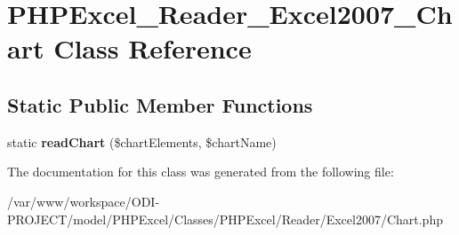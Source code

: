\section{P\+H\+P\+Excel\+\_\+\+Reader\+\_\+\+Excel2007\+\_\+\+Chart Class Reference}
\label{class_p_h_p_excel___reader___excel2007___chart}
\subsection*{Static Public Member Functions}
\begin{DoxyCompactItemize}
\item 
static {\bfseries read\+Chart} (\$chart\+Elements, \$chart\+Name)\label{class_p_h_p_excel___reader___excel2007___chart_a096f59ffdd40d26b10bbdca0f712fab9}

\end{DoxyCompactItemize}


The documentation for this class was generated from the following file\+:\begin{DoxyCompactItemize}
\item 
/var/www/workspace/\+O\+D\+I-\/\+P\+R\+O\+J\+E\+C\+T/model/\+P\+H\+P\+Excel/\+Classes/\+P\+H\+P\+Excel/\+Reader/\+Excel2007/Chart.\+php\end{DoxyCompactItemize}
